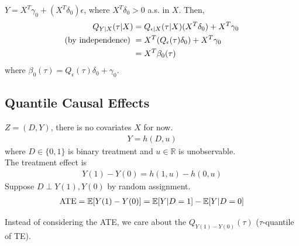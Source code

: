 \documentclass[11pt]{elegantbook}
\begin{document}
\begin{example}
    $Y=X^T\gamma_0+(X^T\delta_0)\epsilon$, where $X^T\delta_0>0$ a.s. in $X$. Then,
    \begin{equation}
        \begin{aligned}
            Q_{Y|X}(\tau|X)&=Q_{\epsilon|X}(\tau|X)(X^T\delta_0)+X^T\gamma_0\\
            \textnormal{(by independence) }&=X^T(Q_\epsilon(\tau)\delta_0)+X^T\gamma_0\\
            &=X^T\beta_0(\tau)
        \end{aligned}
        \nonumber
    \end{equation}
    where $\beta_0(\tau)=Q_\epsilon(\tau)\delta_0+\gamma_0$.
\end{example}

\subsection{Quantile Causal Effects}
$Z=(D,Y)$, there is no covariates $X$ for now.
\begin{equation}
    \begin{aligned}
        Y=h(D,u)
    \end{aligned}
    \nonumber
\end{equation}
where $D\in\{0,1\}$ is binary treatment and $u\in \mathbb{R}$ is unobservable.\\
The treatment effect is
\begin{equation}
    \begin{aligned}
        Y(1)-Y(0)=h(1,u)-h(0,u)
    \end{aligned}
    \nonumber
\end{equation}
Suppose $D\perp Y(1),Y(0)$ by random assignment.
\begin{equation}
    \begin{aligned}
        \textnormal{ATE}=\mathbb{E}[Y(1)-Y(0)]=\mathbb{E}[Y|D=1]-\mathbb{E}[Y|D=0]
    \end{aligned}
    \nonumber
\end{equation}

Instead of considering the ATE, we care about the $Q_{Y(1)-Y(0)}(\tau)$ ($\tau$-quantile of TE).
\end{document}

